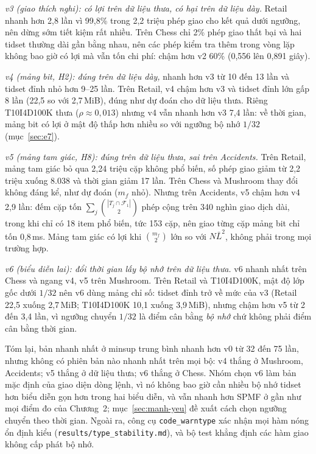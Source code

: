 \emph{v3 (giao thích nghi): có lợi trên dữ liệu thưa, có hại trên dữ liệu dày.} Retail nhanh hơn 2,8 lần vì 99,8\% trong 2,2 triệu phép giao cho kết quả dưới ngưỡng, nên dừng sớm tiết kiệm rất nhiều. Trên Chess chỉ 2\% phép giao thất bại và hai tidset thường dài gần bằng nhau, nên các phép kiểm tra thêm trong vòng lặp không bao giờ có lợi mà vẫn tốn chi phí: chậm hơn v2 60\% (0,556 lên 0,891 giây).

\emph{v4 (mảng bit, H2): đúng trên dữ liệu dày,} nhanh hơn v3 từ 10 đến 13 lần và tidset đỉnh nhỏ hơn 9--25 lần. Trên Retail, v4 chậm hơn v3 và tidset đỉnh lớn gấp 8 lần (22,5 so với 2,7\,MiB), đúng như dự đoán cho dữ liệu thưa. Riêng T10I4D100K thưa ($\rho \approx 0{,}013$) nhưng v4 vẫn nhanh hơn v3 7,4 lần: về thời gian, mảng bit có lợi ở mật độ thấp hơn nhiều so với ngưỡng bộ nhớ $1/32$ (mục~\ref{sec:e7}).

\emph{v5 (mảng tam giác, H8): đúng trên dữ liệu thưa, sai trên Accidents.} Trên Retail, mảng tam giác bỏ qua 2,24 triệu cặp không phổ biến, số phép giao giảm từ 2,2 triệu xuống 8.038 và thời gian giảm 17 lần. Trên Chess và Mushroom thay đổi không đáng kể, như dự đoán ($m_f$ nhỏ). Nhưng trên Accidents, v5 chậm hơn v4 2,9 lần: đếm cặp tốn $\sum_j \binom{|T_j \cap \mathcal{F}_1|}{2}$ phép cộng trên 340 nghìn giao dịch dài, trong khi chỉ có 18 item phổ biến, tức 153 cặp, nên giao từng cặp mảng bit chỉ tốn 0,8\,ms. Mảng tam giác có lợi khi $\binom{m_f}{2}$ lớn so với $N\bar{L}^2$, không phải trong mọi trường hợp.

\emph{v6 (biểu diễn lai): đổi thời gian lấy bộ nhớ trên dữ liệu thưa.} v6 nhanh nhất trên Chess và ngang v4, v5 trên Mushroom. Trên Retail và T10I4D100K, mật độ lớp gốc dưới $1/32$ nên v6 dùng mảng chỉ số: tidset đỉnh trở về mức của v3 (Retail 22,5 xuống 2,7\,MiB; T10I4D100K 10,1 xuống 3,9\,MiB), nhưng chậm hơn v5 từ 2 đến 3,4 lần, vì ngưỡng chuyển $1/32$ là điểm cân bằng \emph{bộ nhớ} chứ không phải điểm cân bằng thời gian.

Tóm lại, bản nhanh nhất ở minsup trung bình nhanh hơn v0 từ 32 đến 75 lần, nhưng không có phiên bản nào nhanh nhất trên mọi bộ: v4 thắng ở Mushroom, Accidents; v5 thắng ở dữ liệu thưa; v6 thắng ở Chess. Nhóm chọn v6 làm bản mặc định của giao diện dòng lệnh, vì nó không bao giờ cần nhiều bộ nhớ tidset hơn biểu diễn gọn hơn trong hai biểu diễn, và vẫn nhanh hơn SPMF ở gần như mọi điểm đo của Chương~2; mục~\ref{sec:manh-yeu} đề xuất cách chọn ngưỡng chuyển theo thời gian. Ngoài ra, công cụ \texttt{code\_warntype} xác nhận mọi hàm nóng ổn định kiểu (\texttt{results/type\_stability.md}), và bộ test khẳng định các hàm giao không cấp phát bộ nhớ.
